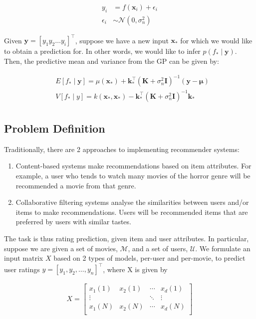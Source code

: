\documentclass[letterpaper]{article}
\begin{document}
\begin{align*}
	y_i &= f(\textbf{x}_i) + \epsilon_i \\
	\epsilon_i &\sim \mathcal{N}(0, \sigma_n^2)
\end{align*}

Given $\textbf{y} = [y_1y_2\ldots y_i]^\top$, suppose we have a new input $\textbf{x}_*$ for which we would like to obtain a prediction for. In other words, we would like to infer $p(f_* \mid \textbf{y})$. Then, the predictive mean and variance from the GP can be given by:

\begin{align*}
	&E[f_* \mid \textbf{y}] = \mu(\textbf{x}_*) + \textbf{k}_*^\top (\textbf{K} + \sigma_n^2 \textbf{I})^{-1} (\textbf{y} - \boldsymbol{\mu}) \\
	&V[f_* \mid y] = k(\textbf{x}_*, \textbf{x}_*) - \textbf{k}_*^\top (\textbf{K} + \sigma_n^2 \textbf{I})^{-1} \textbf{k}_* \\
\end{align*}

\subsection{Problem Definition}
Traditionally, there are 2 approaches to implementing recommender systems:

\begin{enumerate}
	\item Content-based systems make recommendations based on item attributes. For example, a user who tends to watch many movies of the horror genre will be recommended a movie from that genre.
	\item Collaborative filtering systems analyse the similarities between users and/or items to make recommendations. Users will be recommended items that are preferred by users with similar tastes.
\end{enumerate}

The task is thus rating prediction, given item and user attributes. In particular, suppose we are given a set of movies, $\mathcal{M}$, and a set of users, $\mathcal{U}$. We formulate an input matrix $X$ based on 2 types of models, per-user and per-movie, to predict user ratings $y = [y_1, y_2, \ldots, y_n]^\top$, where X is given by

\begin{align*}
	X = \begin{bmatrix}
	x_1(1) & x_2(1) & \cdots & x_d(1)\\
	\vdots & & \ddots & \vdots \\
	x_1(N) & x_2(N) & \cdots & x_d(N) \\
	\end{bmatrix}
\end{align*}
\end{document}
